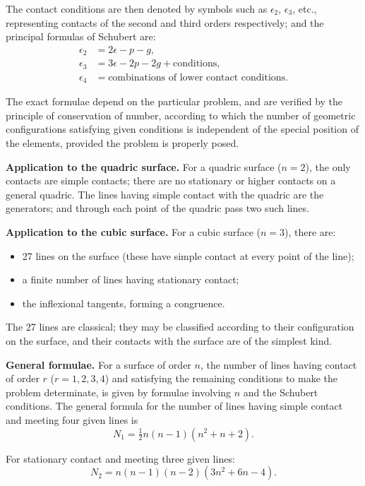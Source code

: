 \documentclass[11pt,a4paper]{book}
\begin{document}
The contact conditions are then denoted by symbols such as $\epsilon_2$,
$\epsilon_3$, etc., representing contacts of the second and third orders respectively;
and the principal formulas of Schubert are:
\begin{align*}
\epsilon_2 &= 2\epsilon - p - g, \\
\epsilon_3 &= 3\epsilon - 2p - 2g + \text{conditions}, \\
\epsilon_4 &= \text{combinations of lower contact conditions}.
\end{align*}

The exact formulae depend on the particular problem, and are verified by
the principle of conservation of number, according to which the number of
geometric configurations satisfying given conditions is independent of the
special position of the elements, provided the problem is properly posed.

\textbf{Application to the quadric surface.} For a quadric surface ($n=2$), the
only contacts are simple contacts; there are no stationary or higher contacts
on a general quadric. The lines having simple contact with the quadric
are the generators; and through each point of the quadric pass two such
lines.

\textbf{Application to the cubic surface.} For a cubic surface ($n=3$), there are:
\begin{itemize}
\item 27 lines on the surface (these have simple contact at every point of the line);
\item a finite number of lines having stationary contact;
\item the inflexional tangents, forming a congruence.
\end{itemize}

The 27 lines are classical; they may be classified according to their
configuration on the surface, and their contacts with the surface are of the
simplest kind.

\textbf{General formulae.} For a surface of order $n$, the number of lines having
contact of order $r$ ($r=1,2,3,4$) and satisfying the remaining conditions
to make the problem determinate, is given by formulae involving $n$ and
the Schubert conditions. The general formula for the number of lines
having simple contact and meeting four given lines is
%
\[
N_1 = \tfrac{1}{2} n(n-1)(n^2 + n + 2).
\]

For stationary contact and meeting three given lines:
%
\[
N_2 = n(n-1)(n-2)(3n^2 + 6n - 4).
\]
\end{document}
